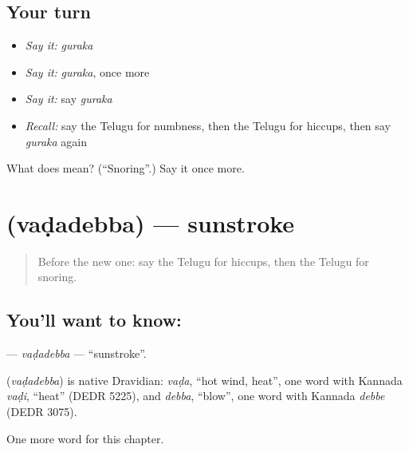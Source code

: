 \subsection*{Your turn}
\begin{itemize}
\raggedright
  \item \emph{Say it:} \emph{guraka}
  \item \emph{Say it:} \emph{guraka}, once more
  \item \emph{Say it:} say \emph{guraka}
  \item \emph{Recall:} say the Telugu for numbness, then the Telugu for hiccups, then say \emph{guraka} again
\end{itemize}

\begin{tcolorbox}[breakable,colback=teal!4,colframe=teal!35!black,title={Before you move on}]
What does  mean? (\textquotedblleft{}Snoring\textquotedblright{}.) Say it once more.
\end{tcolorbox}
\section[\texorpdfstring{\te{వడదెబ్బ} (vaḍadebba)}{వడదెబ్బ (vaḍadebba)}]{ (vaḍadebba) — sunstroke}

\label{lesson:TE-C211-vadadebba}



\begin{quote}
Before the new one: say the Telugu for hiccups, then the Telugu for snoring.
\end{quote}

\subsection*{You'll want to know: }
\textbf{} — \emph{vaḍadebba} — \textquotedblleft{}sunstroke\textquotedblright{}.

\begin{cousinweb}
\textbf{} (\emph{vaḍadebba}) is native Dravidian: \emph{vaḍa}, \textquotedblleft{}hot wind, heat\textquotedblright{}, one word with Kannada \emph{vaḍi}, \textquotedblleft{}heat\textquotedblright{} (DEDR 5225), and \emph{debba}, \textquotedblleft{}blow\textquotedblright{}, one word with Kannada \emph{debbe} (DEDR 3075).
\end{cousinweb}

\begin{grammarlens}[title={What you've built}]
One more word for this chapter.
\end{grammarlens}

